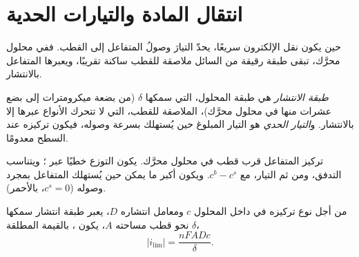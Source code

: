 \section{انتقال المادة والتيارات الحدية}

حين يكون نقل الإلكترون سريعًا، يحدّ التيارَ وصولُ
المتفاعل إلى القطب. ففي محلول محرَّك، تبقى طبقة رقيقة من السائل
ملاصقة للقطب ساكنة تقريبًا، ويعبرها المتفاعل
بالانتشار.

\begin{definition}\label{def:b2:current-potential-curves:limiting-current}
\emph{طبقة الانتشار} هي طبقة المحلول،
التي سمكها $\delta$ (من بضعة ميكرومترات إلى بضع عشرات منها في محلول
محرَّك)، الملاصقة للقطب، التي لا تتحرك الأنواع عبرها إلا
بالانتشار. و\emph{التيار الحدي} هو التيار
المبلوغ حين يُستهلك  بسرعة وصوله، فيكون
تركيزه عند السطح معدومًا.
\end{definition}

\begin{omfigure}

{\small تركيز المتفاعل قرب قطب في محلول
محرَّك. يكون التوزع خطيًا عبر ؛ ويتناسب التدفق، ومن ثم
التيار، مع $c^b - c^s$. ويكون أكبر ما يمكن حين يُستهلك المتفاعل
بمجرد وصوله ($c^s = 0$، بالأحمر).}
\end{omfigure}

\begin{theorem}\label{thm:b2:current-potential-curves:limiting}
من أجل نوع تركيزه في داخل المحلول $c$ ومعامل انتشاره $D$،
يعبر طبقة انتشار سمكها $\delta$ نحو قطب مساحته $A$،
يكون ، بالقيمة المطلقة،
\[
  |i_{\lim}| = \frac{nFADc}{\delta} .
\]
\end{theorem}

